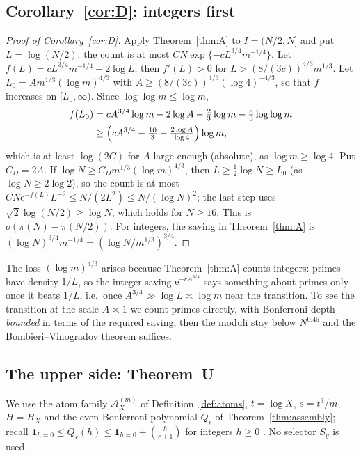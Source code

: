 \documentclass[10pt,reqno]{amsart}
\theoremstyle{definition}
\newcommand{\A}{\mathcal A}
\newcommand{\ind}{\mathbf 1}
\newcommand{\e}{\mathrm e}
\begin{document}
\subsection{Corollary~\ref{cor:D}: integers first}
\begin{proof}[Proof of Corollary~\ref{cor:D}]
Apply Theorem~\ref{thm:A} to $I=(N/2,N]$ and put $L=\log(N/2)$; the
count is at most $CN\exp\{-cL^{3/4}m^{-1/4}\}$.  Let
$f(L)=cL^{3/4}m^{-1/4}-2\log L$; then $f'(L)>0$ for
$L>(8/(3c))^{4/3}m^{1/3}$.  Let $L_0=Am^{1/3}(\log m)^{4/3}$ with
$A\geq(8/(3c))^{4/3}(\log4)^{-4/3}$, so that $f$ increases on
$[L_0,\infty)$.  Since $\log\log m\leq\log m$,
\[
 \begin{aligned}
 f(L_0)&=cA^{3/4}\log m-2\log A-\tfrac23\log m-\tfrac83\log\log m\\
 &\geq\Bigl(cA^{3/4}-\tfrac{10}3-\tfrac{2\log A}{\log4}\Bigr)\log m,
 \end{aligned}
\]
which is at least $\log(2C)$ for $A$ large enough (absolute), as
$\log m\geq\log4$.  Put $C_D=2A$.  If $\log N\geq C_Dm^{1/3}(\log m)^{4/3}$,
then $L\geq\frac12\log N\geq L_0$ (as $\log N\geq2\log2$), so the count
is at most $CN\e^{-f(L)}L^{-2}\leq N/(2L^2)\leq N/(\log N)^2$; the last
step uses $\sqrt2\log(N/2)\geq\log N$, which holds for $N\geq16$.  This
is $o(\pi(N)-\pi(N/2))$.  For integers, the saving in
Theorem~\ref{thm:A} is $(\log N)^{3/4}m^{-1/4}=(\log N/m^{1/3})^{3/4}$.
\end{proof}

The loss $(\log m)^{4/3}$ arises because Theorem~\ref{thm:A} counts
integers: primes have density $1/L$, so the integer saving
$\e^{-cA^{3/4}}$ says something about primes only once it beats
$1/L$, i.e.\ once $A^{3/4}\gg\log L\asymp\log m$ near the transition.
To see the transition at the scale $A\asymp1$ we count primes directly,
with Bonferroni depth \emph{bounded} in terms of the required saving;
then the moduli stay below $N^{0.45}$ and the Bombieri--Vinogradov
theorem suffices.

\subsection{The upper side: Theorem~U}\label{sec:upper}
We use the atom family $\A^{(m)}_X$ of Definition~\ref{def:atoms},
$t=\log X$, $s=t^3/m$, $H=H_X$ and the even Bonferroni polynomial
$Q_r$ of Theorem~\ref{thm:assembly}; recall
$\ind_{h=0}\leq Q_r(h)\leq\ind_{h=0}+\binom h{r+1}$ for integers
$h\geq0$ \cite[Lemma~8.1]{TQ}.  No selector $S_y$ is used.
\end{document}

